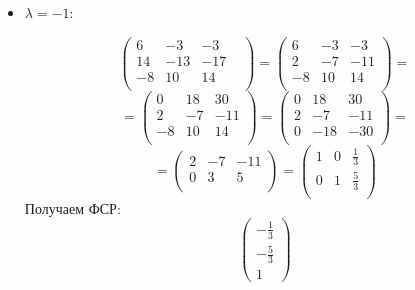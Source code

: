 \documentclass[a4paper,12pt]{article}
\begin{document}
\begin{itemize}
\item $\lambda = -1 $:

\[
\begin{pmatrix}
6 & -3 & -3 & \\
14 & -13 & -17 & \\
-8 & 10 & 14 & \\
\end{pmatrix}
=
\begin{pmatrix}
6 & -3 & -3 \\
2 & -7 & -11  \\
-8 & 10 & 14  \\
\end{pmatrix}
=
\]
\[
=
\begin{pmatrix}
0 & 18 & 30  \\
2 & -7 & -11  \\
-8 & 10 & 14  \\
\end{pmatrix}
=
\begin{pmatrix}
0 & 18 & 30 \\
2 & -7 & -11 \\
0 & -18 & -30  \\
\end{pmatrix}
=
\]
\[
=
\begin{pmatrix}
2 & -7 & -11\\
0 & 3& 5  \\
\end{pmatrix}
=
\begin{pmatrix}
1 & 0 & \frac13 \\
0 & 1& \frac53  \\
\end{pmatrix}
\]
Получаем ФСР:
\[
\begin{pmatrix}
-\frac13 \\-\frac53 \\ 1
\end{pmatrix}
\]


\end{itemize}
\end{document}
